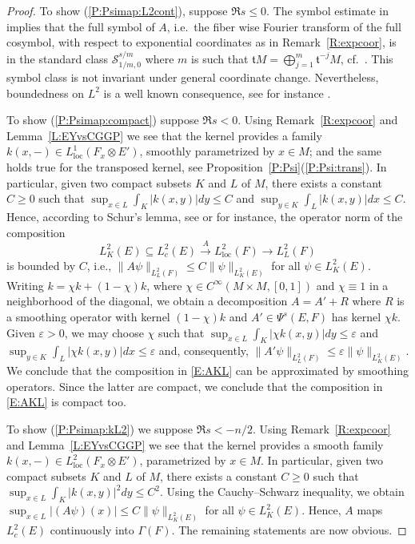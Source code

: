 \documentclass[reqno,12pt]{amsart}
\newcommand\loc{\textrm{loc}}
\newcommand\itemref[1]{(\ref{#1})}
\theoremstyle{plain}
\theoremstyle{definition}
\begin{document}
\begin{proof}
To show \itemref{P:Psimap:L2cont}, suppose $\Re s\leq0$.
The symbol estimate in \cite[Corollary~67]{EY15} implies that the full symbol of $A$, i.e.\ the fiber wise Fourier transform of the full cosymbol, with respect to exponential coordinates as in Remark~\ref{R:expcoor}, is in the standard class $\mathcal S^{s/m}_{1/m,0}$ where $m$ is such that $\mathfrak tM=\bigoplus_{j=1}^m\mathfrak t^{-j}M$, cf.\ \cite[Proposition~10.22]{BG88}.
This symbol class is not invariant under general coordinate change.
Nevertheless, boundedness on $L^2$ is a well known consequence, see for instance \cite[Theorem~6.1]{S01}.


To show \itemref{P:Psimap:compact} suppose $\Re s<0$.
Using Remark~\ref{R:expcoor} and Lemma~\ref{L:EYvsCGGP} we see that the kernel provides a family $k(x,-)\in L^1_\loc(F_x\otimes E')$, smoothly parametrized by $x\in M$; and the same holds true for the transposed kernel, see Proposition~\ref{P:Psi}\itemref{P:Psi:trans}.
In particular, given two compact subsets $K$ and $L$ of $M$, there exists a constant $C\geq0$ such that $\sup_{x\in L}\int_K|k(x,y)|dy\leq C$ and $\sup_{y\in K}\int_L|k(x,y)|dx\leq C$.
Hence, according to Schur's lemma, see \cite[Lemma~9.1]{S01} or \cite[Lemma~15.2]{FS74} for instance, the operator norm of the composition
\begin{equation}\label{E:AKL}
L^2_K(E)\subseteq L^2_c(E)\xrightarrow{A}L^2_\loc(F)\to L^2_L(F)
\end{equation}
is bounded by $C$, i.e., $\|A\psi\|_{L^2_L(F)}\leq C\|\psi\|_{L^2_K(E)}$ for all $\psi\in L^2_K(E)$.
Writing $k=\chi k+(1-\chi)k$, where $\chi\in C^\infty(M\times M,[0,1])$ and $\chi\equiv1$ in a neighborhood of the diagonal, we obtain a decomposition $A=A'+R$ where $R$ is a smoothing operator with kernel $(1-\chi)k$ and $A'\in\Psi^s(E,F)$ has kernel $\chi k$.
Given $\varepsilon>0$, we may choose $\chi$ such that $\sup_{x\in L}\int_K|\chi k(x,y)|dy\leq\varepsilon$ and $\sup_{y\in K}\int_L|\chi k(x,y)|dx\leq\varepsilon$ and, consequently, $\|A'\psi\|_{L^2_L(F)}\leq\varepsilon\|\psi\|_{L^2_K(E)}$.
We conclude that the composition in \eqref{E:AKL} can be approximated by smoothing operators.
Since the latter are compact, we conclude that the composition in \eqref{E:AKL} is  compact too.


To show \itemref{P:Psimap:kL2} we suppose $\Re s<-n/2$.
Using Remark~\ref{R:expcoor} and Lemma~\ref{L:EYvsCGGP} we see that the kernel provides a smooth family $k(x,-)\in L^2_\loc(F_x\otimes E')$, parametrized by $x\in M$.
In particular, given two compact subsets $K$ and $L$ of $M$, there exists a constant $C\geq0$ such that $\sup_{x\in L}\int_K|k(x,y)|^2dy\leq C^2$.
Using the Cauchy--Schwarz inequality, we obtain $\sup_{x\in L}|(A\psi)(x)|\leq C\|\psi\|_{L^2_K(E)}$ for all $\psi\in L^2_K(E)$.
Hence, $A$ maps $L^2_c(E)$ continuously into $\Gamma(F)$.
The remaining statements are now obvious.



\end{proof}
\end{document}
